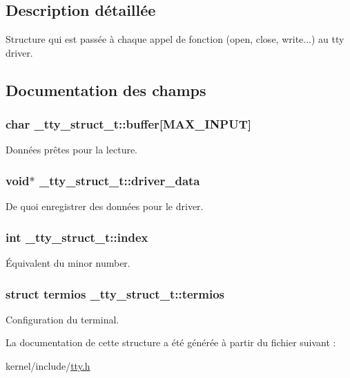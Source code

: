 \subsection{\-Description détaillée}
\-Structure qui est passée à chaque appel de fonction (open, close, write...) au tty driver. 

\subsection{\-Documentation des champs}
\hypertarget{struct__tty__struct__t_ace735f0fca7a2e1c4c75f6ffb9223b19}{
\subsubsection[{buffer}]{\setlength{\rightskip}{0pt plus 5cm}char {\bf \-\_\-tty\-\_\-struct\-\_\-t\-::buffer}\mbox{[}{\bf \-M\-A\-X\-\_\-\-I\-N\-P\-U\-T}\mbox{]}}}\label{struct__tty__struct__t_ace735f0fca7a2e1c4c75f6ffb9223b19}
\-Données prêtes pour la lecture. \hypertarget{struct__tty__struct__t_a974cb784cad13e547e5cace553875f90}{
\subsubsection[{driver\-\_\-data}]{\setlength{\rightskip}{0pt plus 5cm}void$\ast$ {\bf \-\_\-tty\-\_\-struct\-\_\-t\-::driver\-\_\-data}}}\label{struct__tty__struct__t_a974cb784cad13e547e5cace553875f90}
\-De quoi enregistrer des données pour le driver. \hypertarget{struct__tty__struct__t_a4208e736cfcd8e0b00a3c0bbfe4674f7}{
\subsubsection[{index}]{\setlength{\rightskip}{0pt plus 5cm}int {\bf \-\_\-tty\-\_\-struct\-\_\-t\-::index}}}\label{struct__tty__struct__t_a4208e736cfcd8e0b00a3c0bbfe4674f7}
Équivalent du minor number. \hypertarget{struct__tty__struct__t_a39471b82fd4e3a235744e73775ac2523}{
\subsubsection[{termios}]{\setlength{\rightskip}{0pt plus 5cm}struct {\bf termios} {\bf \-\_\-tty\-\_\-struct\-\_\-t\-::termios}}}\label{struct__tty__struct__t_a39471b82fd4e3a235744e73775ac2523}
\-Configuration du terminal. 

\-La documentation de cette structure a été générée à partir du fichier suivant \-:\begin{DoxyCompactItemize}
\item 
kernel/include/\hyperlink{tty_8h}{tty.\-h}\end{DoxyCompactItemize}
